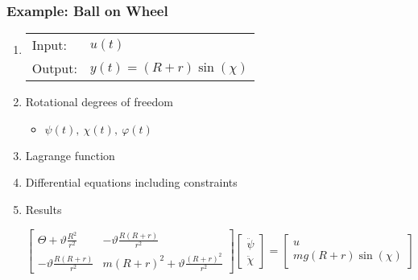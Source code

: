 \documentclass[10pt,a4paper]{scrartcl}
\begin{document}
\begin{multicols*}{3}

\subsubsection{Example: Ball on Wheel}


\begin{enumerate}
\item \begin{tabular}{ll}Input:&$u(t)$\\Output: &$y(t)=(R+r)\sin(\chi)$\end{tabular}

\item Rotational degrees of freedom
\begin{itemize}
\item $\psi(t),\ \chi(t),\ \varphi(t)$
\end{itemize}
\item Lagrange function
\item Differential equations including constraints




\item Results

\scriptsize
$\begin{bmatrix} \Theta+\vartheta \frac{R^2}{r^2}&-\vartheta\frac{R(R+r)}{r^2}\\-\vartheta\frac{R(R+r)}{r^2}&m(R+r)^2+\vartheta\frac{(R+r)^2}{r^2}\end{bmatrix}\begin{bmatrix}\ddot{\psi}\\\ddot{\chi}\end{bmatrix}=\begin{bmatrix}u\\mg(R+r)\sin(\chi)\end{bmatrix}$\normalsize


\end{enumerate}
\end{multicols*}
\end{document}
